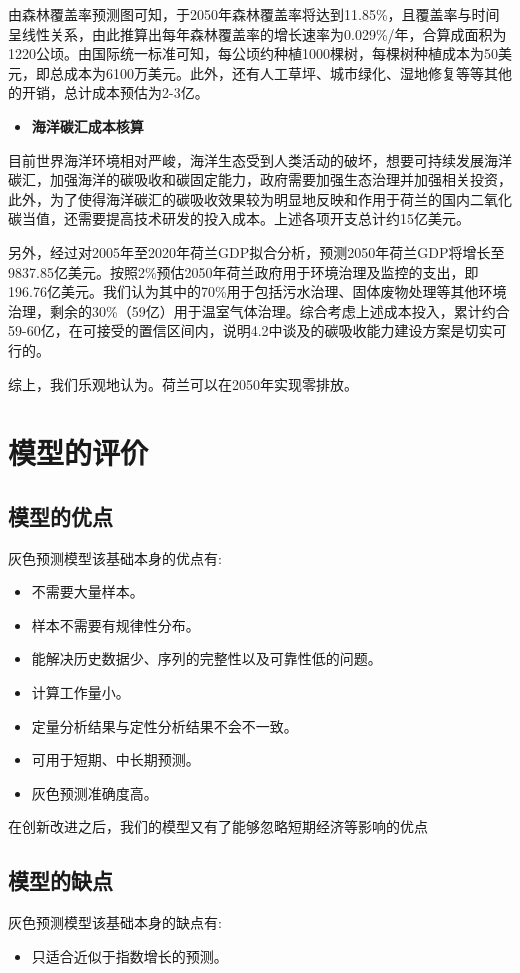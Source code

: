 \documentclass[bwprint]{gmcmthesis}
\numberwithin{figure}{section}
\begin{document}
由森林覆盖率预测图可知，于2050年森林覆盖率将达到11.85\%，且覆盖率与时间呈线性关系，由此推算出每年森林覆盖率的增长速率为0.029\%/年，合算成面积为1220公顷。由国际统一标准可知，每公顷约种植1000棵树，每棵树种植成本为50美元，即总成本为6100万美元。此外，还有人工草坪、城市绿化、湿地修复等等其他的开销，总计成本预估为2-3亿。

\begin{itemize}
	\item \textbf{海洋碳汇成本核算}
\end{itemize}

目前世界海洋环境相对严峻，海洋生态受到人类活动的破坏，想要可持续发展海洋碳汇，加强海洋的碳吸收和碳固定能力，政府需要加强生态治理并加强相关投资，此外，为了使得海洋碳汇的碳吸收效果较为明显地反映和作用于荷兰的国内二氧化碳当值，还需要提高技术研发的投入成本。上述各项开支总计约15亿美元。

另外，经过对2005年至2020年荷兰GDP拟合分析，预测2050年荷兰GDP将增长至9837.85亿美元。按照2\%预估2050年荷兰政府用于环境治理及监控的支出，即196.76亿美元。我们认为其中的70\%用于包括污水治理、固体废物处理等其他环境治理，剩余的30\%（59亿）用于温室气体治理。综合考虑上述成本投入，累计约合59-60亿，在可接受的置信区间内，说明4.2中谈及的碳吸收能力建设方案是切实可行的。

综上，我们乐观地认为。荷兰可以在2050年实现零排放。
\section{模型的评价}
\subsection{模型的优点}
灰色预测模型该基础本身的优点有:    
\begin{itemize}
\item 不需要大量样本。
\item 样本不需要有规律性分布。
\item 能解决历史数据少、序列的完整性以及可靠性低的问题。
\item 计算工作量小。
\item 定量分析结果与定性分析结果不会不一致。
\item 可用于短期、中长期预测。
\item 灰色预测准确度高。
\end{itemize}

在创新改进之后，我们的模型又有了能够忽略短期经济等影响的优点
\subsection{模型的缺点}
灰色预测模型该基础本身的缺点有:
\begin{itemize}
	\item 只适合近似于指数增长的预测。
	\end{itemize}
\end{document}
